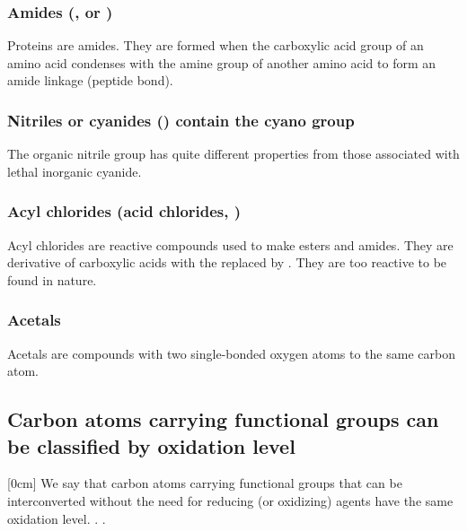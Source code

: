 \subsubsection*{Amides (,  or )}

Proteins are amides. They are formed when the carboxylic acid group of an amino acid condenses with the amine group of another amino acid to form an amide linkage (peptide bond).

\subsubsection*{Nitriles or cyanides () contain the cyano group }

The organic nitrile group has quite different properties from those associated with lethal inorganic cyanide.

\subsubsection*{Acyl chlorides (acid chlorides, )}

Acyl chlorides are reactive compounds used to make esters and amides. They are derivative of carboxylic acids with the  replaced by . They are too reactive to be found in nature.

\subsubsection*{Acetals}

Acetals are compounds with two single-bonded oxygen atoms to the same carbon atom.


\subsection{Carbon atoms carrying functional groups can be classified by oxidation level}

[0cm] 
We say that carbon atoms carrying functional groups that can be interconverted without the need for reducing (or oxidizing) agents have the same oxidation level. . .

